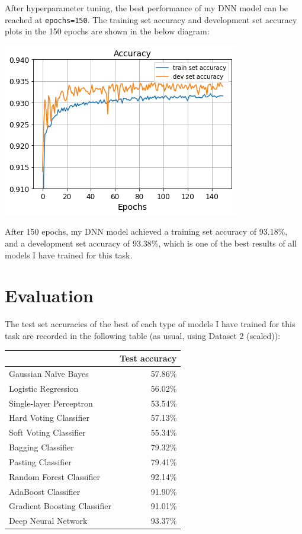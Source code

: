 \documentclass[12pt,twoside,a4paper]{article}
\begin{document}
After hyperparameter tuning, the best performance of my DNN model can be reached at \texttt{epochs=150}. The training set accuracy and development set accuracy plots in the 150 epochs are shown in the below diagram:

\begin{center}
\includegraphics[width=0.5\linewidth]{images/dnn-accuracy-2.png}
\end{center}

After 150 epochs, my DNN model achieved a training set accuracy of 93.18\%, and a development set accuracy of 93.38\%, which is one of the best results of all models I have trained for this task. 

\section{Evaluation}

The test set accuracies of the best of each type of models I have trained for this task are recorded in the following table (as usual, using Dataset 2 (scaled)):

\begin{center}
\begin{tabular}{lr}
\toprule
{} & Test accuracy \\ 
\midrule
Gaussian Naïve Bayes & 57.86\% \\ 
Logistic Regression & 56.02\% \\ 
Single-layer Perceptron & 53.54\% \\ 
\midrule
Hard Voting Classifier & 57.13\% \\
Soft Voting Classifier & 55.34\% \\
\midrule
Bagging Classifier & 79.32\% \\
Pasting Classifier & 79.41\% \\
Random Forest Classifier & 92.14\% \\
AdaBoost Classifier & 91.90\% \\
Gradient Boosting Classifier & 91.01\% \\
\midrule
Deep Neural Network & 93.37\% \\
\bottomrule
\end{tabular} 
\end{center}
\end{document}
